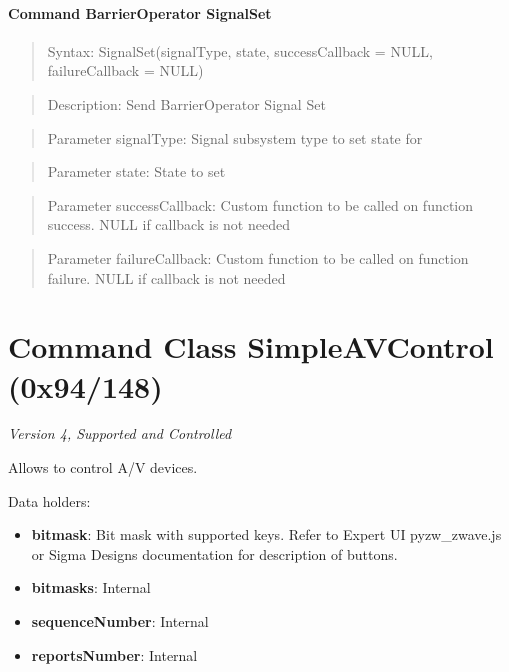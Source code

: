 \paragraph{Command BarrierOperator SignalSet}
\begin{quote}Syntax: SignalSet(signalType, state, successCallback = NULL, failureCallback = NULL)\end{quote}
\begin{quote}Description: Send BarrierOperator Signal Set\end{quote}
\begin{quote}Parameter signalType: Signal subsystem type to set state for\end{quote}
\begin{quote}Parameter state: State to set\end{quote}
\begin{quote}Parameter successCallback: Custom function to be called on function success. NULL if callback is not needed\end{quote}
\begin{quote}Parameter failureCallback: Custom function to be called on function failure. NULL if callback is not needed\end{quote}



\section{Command Class SimpleAVControl (0x94/148)}

\textit{Version 4, Supported and Controlled}
\newline

Allows to control A/V devices.
\newline

\noindent
Data holders:

\begin{itemize}
\item \textbf{bitmask}: Bit mask with supported keys. Refer to Expert UI pyzw\_zwave.js or Sigma Designs documentation for description of buttons.
\item \textbf{bitmasks}: Internal
\item \textbf{sequenceNumber}: Internal
\item \textbf{reportsNumber}: Internal
\end{itemize}

